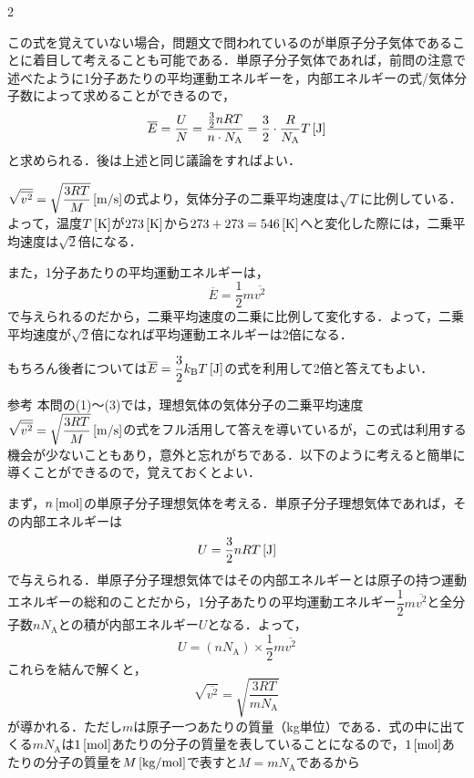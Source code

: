 \begin{multicols}{2}
\begin{bekkai}
\hspace*{1zw}この式を覚えていない場合，問題文で問われているのが単原子分子気体であることに着目して考えることも可能である．単原子分子気体であれば，前問の注意で述べたように1分子あたりの平均運動エネルギーを，内部エネルギーの式/気体分子数によって求めることができるので，
\[\overline{E}=\frac{U}{N}=\frac{\frac{3}{2}nRT}{n\cdot N_{\mathrm{A}}}=\frac{3}{2}\cdot\frac{R}{N_{\mathrm{A}}}T\,[\mathrm{J}]\]
と求められる．後は上述と同じ議論をすればよい．
\end{bekkai}
\begin{komon}
 $\sqrt{\overline{v^2}}=\sqrt{\dfrac{3RT}{M}}\,[\mathrm{m/s}]$の式より，気体分子の二乗平均速度は$\sqrt{T}$に比例している．よって，温度$T\,[\mathrm{K}]$が$273\,[\mathrm{K}]$から$273+273=546\,[\mathrm{K}]$へと変化した際には，二乗平均速度は$\sqrt{2}$倍になる．\Ans\par
       \hspace*{1zw}また，1分子あたりの平均運動エネルギーは，
       \[\overline{E}=\frac{1}{2}m\overline{v^2}\]
       で与えられるのだから，二乗平均速度の二乗に比例して変化する．よって，二乗平均速度が$\sqrt{2}$倍になれば平均運動エネルギーは2倍になる．\Ans
\end{komon}
\begin{bekkai}
もちろん後者については$\overline{E}=\dfrac{3}{2}k_{\mathrm{B}}T\,[\mathrm{J}]$の式を利用して2倍と答えてもよい．
\end{bekkai}
\begin{bsHosoku}{参考}
本問の(1)〜(3)では，理想気体の気体分子の二乗平均速度$\sqrt{\overline{v^2}}=\sqrt{\dfrac{3RT}{M}}\,[\mathrm{m/s}]$の式をフル活用して答えを導いているが，この式は利用する機会が少ないこともあり，意外と忘れがちである．以下のように考えると簡単に導くことができるので，覚えておくとよい．\par
\hspace*{1zw}まず，$n\,[\mathrm{mol}]$の単原子分子理想気体を考える．単原子分子理想気体であれば，その内部エネルギーは
\[U=\frac{3}{2}nRT\,[\mathrm{J}]\]
で与えられる．単原子分子理想気体ではその内部エネルギーとは原子の持つ運動エネルギーの総和のことだから，1分子あたりの平均運動エネルギー$\dfrac{1}{2}m\overline{v^2}$と全分子数$nN_{\mathrm{A}}$との積が内部エネルギー$U$となる．よって，
\[U=(nN_{\mathrm{A}})\times\frac{1}{2}m\overline{v^2}\]
\hspace*{1zw}これらを結んで解くと，
\[\sqrt{\overline{v^2}}=\sqrt{\frac{3RT}{mN_{\mathrm{A}}}}\]
が導かれる．ただし$m$は原子一つあたりの質量（{\gtfamily kg}単位）である．式の中に出てくる$mN_{\mathrm{A}}$は$1\,[\mathrm{mol}]$あたりの分子の質量を表していることになるので，$1\,[\mathrm{mol}]$あたりの分子の質量を$M\,[\mathrm{kg/mol}]$で表すと$M=mN_{\mathrm{A}}$であるから

\end{bsHosoku}
\end{multicols}
